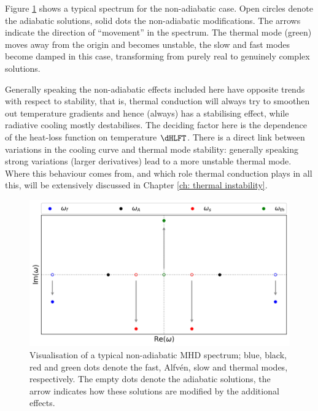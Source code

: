 Figure \ref{fig: nonadiabatic_spectrum} shows a typical spectrum for the non-adiabatic case. Open circles denote the adiabatic solutions, solid dots the non-adiabatic modifications. The arrows indicate the direction of ``movement'' in the spectrum. The thermal mode (green) moves away from the origin and becomes unstable, the slow and fast modes become damped in this case, transforming from purely real to genuinely complex solutions.

Generally speaking the non-adiabatic effects included here have opposite trends with respect to stability, that is, thermal conduction will always try to smoothen out temperature gradients and hence (always) has a stabilising effect, while radiative cooling mostly destabilises. The deciding factor here is the dependence of the heat-loss function on temperature $\dHLFT$. There is a direct link between variations in the cooling curve and thermal mode stability: generally speaking strong variations (larger derivatives) lead to a more unstable thermal mode. Where this behaviour comes from, and which role thermal conduction plays in all this, will be extensively discussed in Chapter \ref{ch: thermal instability}.

\begin{figure}[t]
  \centering
  \includegraphics[width=\textwidth]{spectrum_nonadiabatic.png}
  \caption{
    Visualisation of a typical non-adiabatic MHD spectrum; blue, black, red and green dots denote the fast, Alfv\'en, slow and thermal modes, respectively. The empty dots denote the adiabatic solutions, the arrow indicates how these solutions are modified by the additional effects.
  }
  \label{fig: nonadiabatic_spectrum}
\end{figure}


